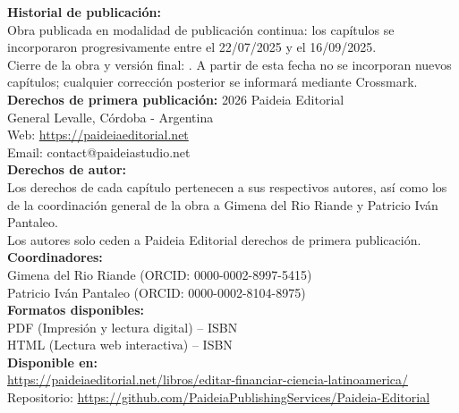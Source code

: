 \noindent\textbf{Historial de publicación:}\\
Obra publicada en modalidad de publicación continua: los capítulos se incorporaron progresivamente entre el 22/07/2025 y el 16/09/2025.\\
Cierre de la obra y versión final: \fechacierre. A partir de esta fecha no se incorporan nuevos capítulos; cualquier corrección posterior se informará mediante Crossmark.\\[1em]

\noindent\textbf{Derechos de primera publicación:} 2026 \quad Paideia Editorial\\
General Levalle, Córdoba - Argentina\\
Web: \url{https://paideiaeditorial.net}\\
Email: contact@paideiastudio.net\\[1em]

\noindent\textbf{Derechos de autor:}\\
Los derechos de cada capítulo pertenecen a sus respectivos autores, así como los de la coordinación general de la obra a Gimena del Rio Riande y Patricio Iván Pantaleo.\\
Los autores solo ceden a Paideia Editorial derechos de primera publicación.\\[1em]

\noindent\textbf{Coordinadores:}\\
Gimena del Rio Riande (ORCID: 0000-0002-8997-5415)\\
Patricio Iván Pantaleo (ORCID: 0000-0002-8104-8975)\\[1em]

\noindent\textbf{Formatos disponibles:}\\
PDF (Impresión y lectura digital) -- ISBN \isbnpdf\\
HTML (Lectura web interactiva) -- ISBN \isbnhtml\\[1em]

\noindent\textbf{Disponible en:}\\
\url{https://paideiaeditorial.net/libros/editar-financiar-ciencia-latinoamerica/}\\
Repositorio: \url{https://github.com/PaideiaPublishingServices/Paideia-Editorial}\\[1em]

